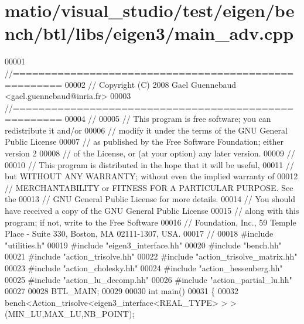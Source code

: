 \hypertarget{matio_2visual__studio_2test_2eigen_2bench_2btl_2libs_2eigen3_2main__adv_8cpp_source}{}\section{matio/visual\+\_\+studio/test/eigen/bench/btl/libs/eigen3/main\+\_\+adv.cpp}
\label{matio_2visual__studio_2test_2eigen_2bench_2btl_2libs_2eigen3_2main__adv_8cpp_source}

\begin{DoxyCode}
00001 \textcolor{comment}{//=====================================================}
00002 \textcolor{comment}{// Copyright (C) 2008 Gael Guennebaud <gael.guennebaud@inria.fr>}
00003 \textcolor{comment}{//=====================================================}
00004 \textcolor{comment}{//}
00005 \textcolor{comment}{// This program is free software; you can redistribute it and/or}
00006 \textcolor{comment}{// modify it under the terms of the GNU General Public License}
00007 \textcolor{comment}{// as published by the Free Software Foundation; either version 2}
00008 \textcolor{comment}{// of the License, or (at your option) any later version.}
00009 \textcolor{comment}{//}
00010 \textcolor{comment}{// This program is distributed in the hope that it will be useful,}
00011 \textcolor{comment}{// but WITHOUT ANY WARRANTY; without even the implied warranty of}
00012 \textcolor{comment}{// MERCHANTABILITY or FITNESS FOR A PARTICULAR PURPOSE.  See the}
00013 \textcolor{comment}{// GNU General Public License for more details.}
00014 \textcolor{comment}{// You should have received a copy of the GNU General Public License}
00015 \textcolor{comment}{// along with this program; if not, write to the Free Software}
00016 \textcolor{comment}{// Foundation, Inc., 59 Temple Place - Suite 330, Boston, MA  02111-1307, USA.}
00017 \textcolor{comment}{//}
00018 \textcolor{preprocessor}{#include "utilities.h"}
00019 \textcolor{preprocessor}{#include "eigen3\_interface.hh"}
00020 \textcolor{preprocessor}{#include "bench.hh"}
00021 \textcolor{preprocessor}{#include "action\_trisolve.hh"}
00022 \textcolor{preprocessor}{#include "action\_trisolve\_matrix.hh"}
00023 \textcolor{preprocessor}{#include "action\_cholesky.hh"}
00024 \textcolor{preprocessor}{#include "action\_hessenberg.hh"}
00025 \textcolor{preprocessor}{#include "action\_lu\_decomp.hh"}
00026 \textcolor{preprocessor}{#include "action\_partial\_lu.hh"}
00027 
00028 BTL\_MAIN;
00029 
00030 \textcolor{keywordtype}{int} main()
00031 \{
00032   bench<Action\_trisolve<eigen3\_interface<REAL\_TYPE> > >(MIN\_LU,MAX\_LU,NB\_POINT);

\end{DoxyCode}
